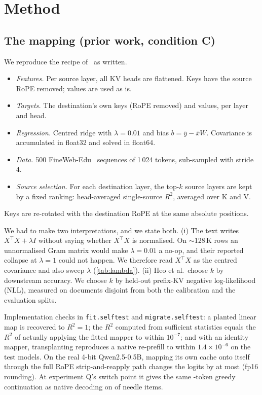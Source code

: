 \section{Method}\label{sec:method}

\subsection{The mapping (prior work, condition C)}\label{sec:heo}
We reproduce the recipe of~\citep{heo2026crossmodel} as written.
\begin{itemize}
\item \emph{Features.} Per source layer, all KV heads are flattened. Keys have the source RoPE removed; values are used as is.
\item \emph{Targets.} The destination's own keys (RoPE removed) and values, per layer and head.
\item \emph{Regression.} Centred ridge with $\lambda=0.01$ and bias $b=\bar y-\bar xW$. Covariance is accumulated in float32 and solved in float64.
\item \emph{Data.} 500 FineWeb-Edu~\citep{penedo2024fineweb} sequences of 1\,024 tokens, sub-sampled with stride 4.
\item \emph{Source selection.} For each destination layer, the top-$k$ source layers are kept by a fixed ranking: head-averaged single-source $R^2$, averaged over K and V.
\end{itemize}
Keys are re-rotated with the destination RoPE at the same absolute positions.

We had to make two interpretations, and we state both.
(i) The text writes $X^\top X+\lambda I$ without saying whether $X^\top X$ is normalised.
On $\sim$128\,K rows an unnormalised Gram matrix would make $\lambda=0.01$ a no-op, and their reported collapse at $\lambda=1$ could not happen.
We therefore read $X^\top X$ as the centred covariance and also sweep $\lambda$ (\cref{tab:lambda}).
(ii) Heo et al.\ choose $k$ by downstream accuracy.
We choose $k$ by held-out prefix-KV negative log-likelihood (NLL), measured on documents disjoint from both the calibration and the evaluation splits.

Implementation checks in \texttt{fit.selftest} and \texttt{migrate.selftest}:
a planted linear map is recovered to $R^2=1$;
the $R^2$ computed from sufficient statistics equals the $R^2$ of actually applying the fitted mapper to within $10^{-7}$;
and with an identity mapper, transplanting reproduces a native re-prefill to within $1.4\times10^{-6}$ on the test models.
On the real 4-bit Qwen2.5-0.5B, mapping its own cache onto itself through the full RoPE strip-and-reapply path changes the logits by at most  (fp16 rounding).
At experiment Q's switch point it gives the same -token greedy continuation as native decoding on  of  needle items.

